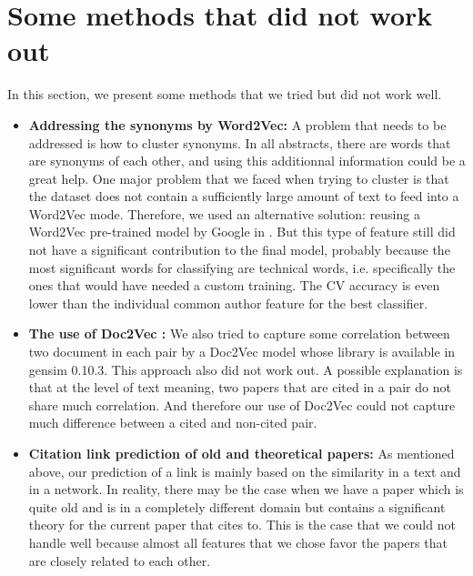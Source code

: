 \documentclass{article}
\begin{document}
\section{Some methods that did not work out}
\label{sec:notwork}
In this section, we present some methods that we tried but did not work well.
\begin{itemize}
\item \textbf{Addressing the synonyms by Word2Vec:} A problem that needs to be addressed is how to cluster synonyms. In all abstracts, there are words that are synonyms of each other, and using this additionnal information could be a great help. One major problem that we faced when trying to cluster is that the dataset does not contain a sufficiently large amount of text to feed into a Word2Vec mode. Therefore, we used an alternative solution: reusing a Word2Vec pre-trained model by Google in \cite{word2vecgg}. But this type of feature still did not have a significant contribution to the final model, probably because the most significant words for classifying are technical words, i.e. specifically the ones that would have needed a custom training. The CV accuracy is even lower than the individual common author feature for the best classifier.
\item \textbf{The use of Doc2Vec \cite{DBLP:LeM14}:} We also tried to capture some correlation between two document in each pair by a Doc2Vec model whose library is available in gensim 0.10.3. This approach also did not work out. A possible explanation is that at the level of text meaning, two papers that are cited in a pair do not share much correlation. And therefore our use of Doc2Vec could not capture much difference between a cited and non-cited pair.
\item \textbf{Citation link prediction of old and theoretical papers:} As mentioned above, our prediction of a link is mainly based on the similarity in a text and in a network. In reality, there may be the case when we have a paper which is quite old and is in a completely different domain but contains a significant theory for the current paper that cites to. This is the case that we could not handle well because almost all features that we chose favor the papers that are closely related to each other.
\end{itemize}
\end{document}

